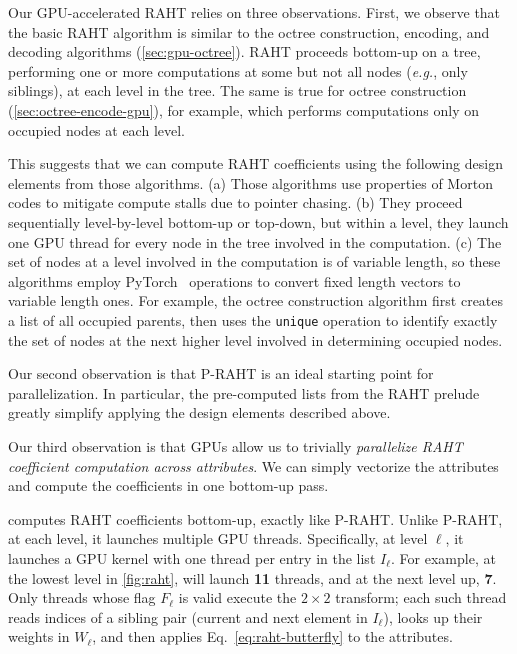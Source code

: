 %
Our GPU-accelerated RAHT relies on three observations.
%
First, we observe that the basic RAHT algorithm is similar to the octree construction, encoding, and decoding algorithms (\cref{sec:gpu-octree}).
%
RAHT proceeds bottom-up on a tree, performing one or more computations at some but not all nodes (\textit{e.g.}, only siblings), at each level in the tree.
%
The same is true for octree construction (\cref{sec:octree-encode-gpu}), for example, which performs computations only on occupied nodes at each level.

This suggests that we can compute RAHT coefficients using the following design elements from those algorithms.
%
(a) Those algorithms use properties of Morton codes to mitigate compute stalls due to pointer chasing.
%
(b) They proceed sequentially level-by-level bottom-up or top-down, but within a level, they launch one GPU thread for every node in the tree involved in the computation.
%
(c) The set of nodes at a level involved in the computation is of variable length, so these algorithms employ PyTorch~\cite{pytorch} operations to convert fixed length vectors to variable length ones.
%
For example, the octree construction algorithm first creates a list of all occupied parents, then uses the \texttt{unique} operation to identify exactly the set of nodes at the next higher level involved in determining occupied nodes.

Our second observation is that P-RAHT is an ideal starting point for parallelization.
%
In particular, the pre-computed lists from the RAHT prelude greatly simplify applying the design elements described above.

Our third observation is that GPUs allow us to trivially \textit{parallelize RAHT coefficient computation across attributes}.
%
We can simply vectorize the attributes and compute the coefficients in one bottom-up pass.

%
\gsnfs{} computes RAHT coefficients bottom-up, exactly like P-RAHT.
%
Unlike P-RAHT, at each level, it launches multiple GPU threads.
%
Specifically, at level $\ell$, it launches a GPU kernel with one thread per entry in the list $I_\ell$.
%
For example, at the lowest level in \cref{fig:raht}, \gsnfs{} will launch \textbf{11} threads, and at the next level up, \textbf{7}.
%
Only threads whose flag $F_\ell$ is valid execute the $2\times2$ transform; each such thread reads indices of a sibling pair (current and next element in $I_\ell$), looks up their weights in $W_\ell$, and then applies Eq.~\ref{eq:raht-butterfly} to the attributes.

